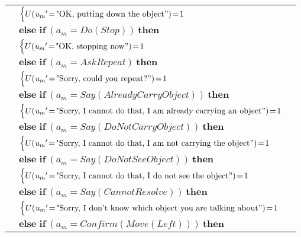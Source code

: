 \begin{footnotesize}
\begin{longtable}{p{2cm}l}
& \;\;\;\;\; $ \begin{cases}U(\mathit{u_m}'\!=\!\text{"OK, putting down the object}")\!=\!1 \end{cases}$ \vspace{1mm} \\ & $ \textbf{else if} \ (\mathit{a_m}\!=\!\mathit{Do(Stop)}) \ \textbf{then}$ \\
& \;\;\;\;\; $ \begin{cases}U(\mathit{u_m}'\!=\!\text{"OK, stopping now}")\!=\!1 \end{cases}$ \vspace{1mm} \\ & $ \textbf{else if} \ (\mathit{a_m}\!=\!\mathit{AskRepeat}) \ \textbf{then}$ \\
& \;\;\;\;\; $ \begin{cases}U(\mathit{u_m}'\!=\!\text{"Sorry, could you repeat?}")\!=\!1 \end{cases}$ \vspace{1mm} \\ & $ \textbf{else if} \ (\mathit{a_m}\!=\!\mathit{Say(AlreadyCarryObject)}) \ \textbf{then}$ \\
& \;\;\;\;\; $ \begin{cases}U(\mathit{u_m}'\!=\!\text{"Sorry, I cannot do that, I am already carrying an object}")\!=\!1 \end{cases}$ \vspace{1mm} \\ & $ \textbf{else if} \ (\mathit{a_m}\!=\!\mathit{Say(DoNotCarryObject)}) \ \textbf{then}$ \\
& \;\;\;\;\; $ \begin{cases}U(\mathit{u_m}'\!=\!\text{"Sorry, I cannot do that, I am not carrying the object}")\!=\!1 \end{cases}$ \vspace{1mm} \\ & $ \textbf{else if} \ (\mathit{a_m}\!=\!\mathit{Say(DoNotSeeObject)}) \ \textbf{then}$ \\
& \;\;\;\;\; $ \begin{cases}U(\mathit{u_m}'\!=\!\text{"Sorry, I cannot do that, I do not see the object}")\!=\!1 \end{cases}$ \vspace{1mm} \\ & $ \textbf{else if} \ (\mathit{a_m}\!=\!\mathit{Say(CannotResolve)}) \ \textbf{then}$ \\
& \;\;\;\;\; $ \begin{cases}U(\mathit{u_m}'\!=\!\text{"Sorry, I don't know which object you are talking about}")\!=\!1 \end{cases}$ \vspace{1mm} \\ & $ \textbf{else if} \ (\mathit{a_m}\!=\!\mathit{Confirm(Move(Left))}) \ \textbf{then}$ \\

\end{longtable}
\end{footnotesize}

